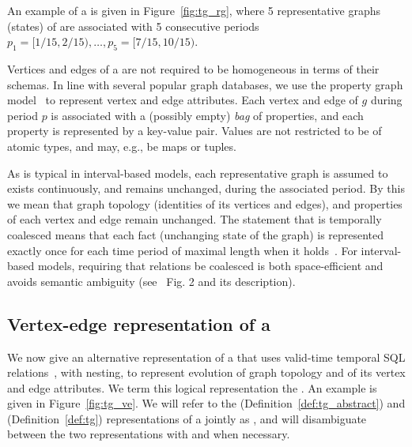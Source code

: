 An example of a \tg is given in Figure~\ref{fig:tg_rg}, where 5
representative graphs (states) of  are associated with 5
consecutive periods $p_1=[1/15, 2/15), \ldots, p_5=[7/15, 10/15)$. 

    Vertices and edges of a \tg are not required to be homogeneous in
    terms of their schemas.  In line with several popular graph
    databases, we use the property graph model~\cite{GraphDB} to
    represent vertex and edge attributes.  Each vertex and edge of $g$
    during period $p$ is associated with a (possibly empty) {\em bag}
    of properties, and each property is represented by a key-value pair.
    Values are not restricted to be of atomic types, and may, e.g., be
    maps or tuples.

As is typical in interval-based models, each representative graph is
assumed to exists continuously, and remains unchanged, during the
associated period.  By this we mean that graph topology (identities of
its vertices and edges), and properties of each vertex and edge remain
unchanged.
%
The statement that \tgg is temporally coalesced means that each fact
(unchanging state of the graph) is represented exactly once for each
time period of maximal length when it
holds~\cite{DBLP:conf/vldb/BohlenSS96}.  For interval-based models,
requiring that relations be coalesced is both space-efficient and
avoids semantic ambiguity (see~\cite{DBLP:reference/db/JensenS09k}
Fig. 2 and its description).

\subsection{Vertex-edge representation of a \tg}
\label{sec:model:ve}

We now give an alternative representation of a \tg that uses
valid-time temporal SQL relations~\cite{DBLP:conf/vldb/BohlenSS96},
with nesting, to represent evolution of graph topology and of its
vertex and edge attributes.  We term this logical representation the
{\em \ve \tg}.  An example is given in
Figure~\ref{fig:tg_ve}.  We will refer to the \rgs
(Definition~\ref{def:tg_abstract}) and \ve (Definition~\ref{def:tg})
representations of a \tg jointly as , and will disambiguate
between the two representations with \trg and \tve when necessary.

